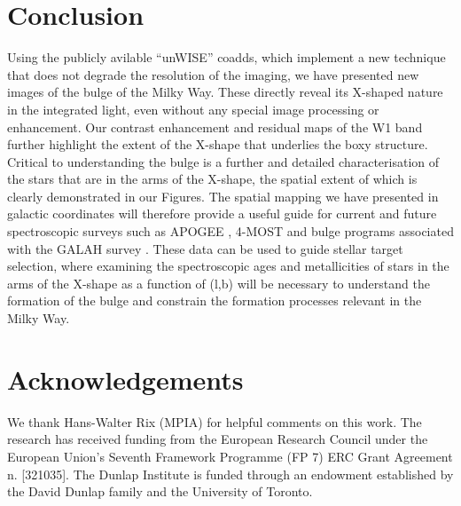 \documentclass[12pt, preprint]{aastex}
\begin{document}
\section{Conclusion}

Using the publicly avilable ``unWISE'' coadds, which implement a new technique that does not degrade the resolution of the imaging, we have presented new images of the bulge of the Milky Way. These directly reveal its X-shaped nature in the integrated light, even without any special image processing or enhancement. Our contrast enhancement and residual maps of the W1 band further highlight the extent of the X-shape that underlies the boxy structure. Critical to understanding the bulge is a further and detailed characterisation of the stars that are in the arms of the X-shape, the spatial extent of which is clearly demonstrated in our Figures. The spatial mapping we have presented in galactic coordinates will therefore provide a useful guide for current and future spectroscopic surveys such as APOGEE \citep{Majewski2015}, 4-MOST \citep{4most} and bulge programs associated with the GALAH survey \citep{deSilva2015}. These data can be used to guide stellar target selection, where examining the spectroscopic ages \citep[e.g.][]{Martig2016, Ness2016} and metallicities of stars in the arms of the X-shape as a function of (l,b) will be necessary to understand the formation of the bulge and constrain the formation processes relevant in the Milky Way. 


\section{Acknowledgements} 
We thank Hans-Walter Rix (MPIA) for helpful comments on this work. 
The research has received funding from the European Research Council under the European Union's Seventh Framework Programme (FP 7) ERC Grant Agreement n.
[321035].
%
The Dunlap Institute is funded through an endowment established by the David Dunlap family and the University of Toronto.


\end{document}
